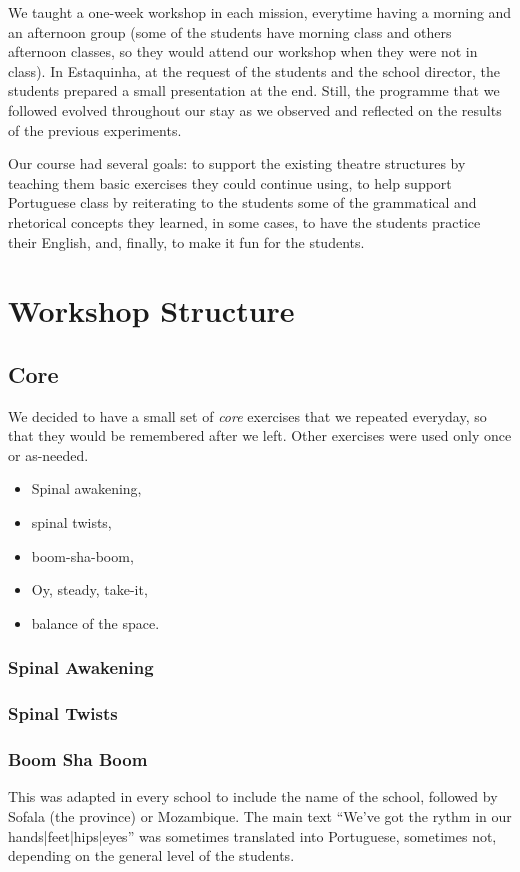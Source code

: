 \documentclass[article,twocolumn,twoside]{memoir}
\begin{document}
We taught a one-week workshop in each mission, everytime having a morning and
an afternoon group (some of the students have morning class and others
afternoon classes, so they would attend our workshop when they were not in
class). In Estaquinha, at the request of the students and the school director,
the students prepared a small presentation at the end. Still, the programme
that we followed evolved throughout our stay as we observed and reflected on
the results of the previous experiments.

Our course had several goals: to support the existing theatre structures by
teaching them basic exercises they could continue using, to help support
Portuguese class by reiterating to the students some of the grammatical and
rhetorical concepts they learned, in some cases, to have the students practice
their English, and, finally, to make it fun for the students.

\chapter{Workshop Structure}

\section{Core}

We decided to have a small set of \textit{core} exercises that we repeated
everyday, so that they would be remembered after we left. Other exercises were
used only once or as-needed.

\begin{itemize}
\item Spinal awakening,
\item spinal twists,
\item boom-sha-boom,
\item Oy, steady, take-it,
\item balance of the space.
\end{itemize}

\subsection{Spinal Awakening}
\subsection{Spinal Twists}
\subsection{Boom Sha Boom}
This was adapted in every school to include the name of the school, followed by
Sofala (the province) or Mozambique. The main text ``We've got the rythm in our
hands|feet|hips|eyes'' was sometimes translated into Portuguese, sometimes not,
depending on the general level of the students.
\end{document}
